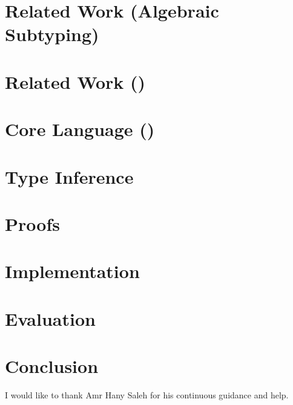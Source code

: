 \documentclass[acmsmall,10pt]{acmart}\settopmatter{printfolios=true}
\begin{document}
\section{Related Work (Algebraic Subtyping)}


\section{Related Work (\eff)}




\section{Core Language (\core)}








\section{Type Inference}



\section{Proofs}


\section{Implementation}


\section{Evaluation}


\section{Conclusion}


\appendix

\begin{acks}
  I would like to thank Amr Hany Saleh for his continuous guidance and help.
\end{acks}


\nocite{*}
\end{document}
